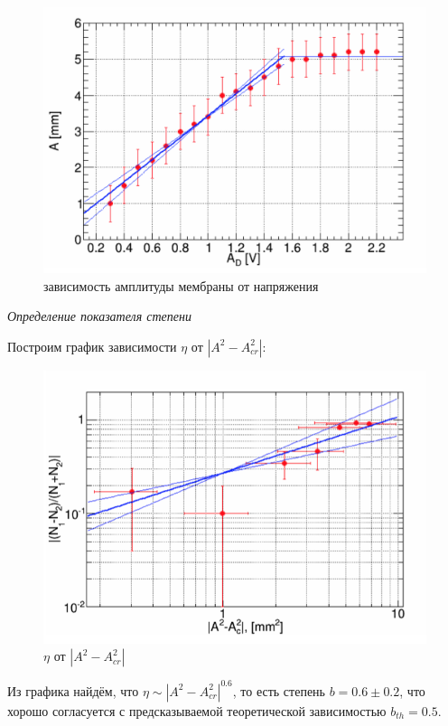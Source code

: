\documentclass[a4paper, 12pt]{article}
\begin{document}
\begin{figure}
	\includegraphics[scale=0.5]{img/A(V).jpg}
	\caption{зависимость амплитуды мембраны от напряжения}
\end{figure}

\emph{Определение показателя степени}

Построим график зависимости $\eta$ от $|A^2 - A_{cr}^2|$:

\begin{figure}[h]
	\includegraphics[scale=1]{img/result.jpg}
	\caption{$\eta$ от $|A^2 - A_{cr}^2|$}
\end{figure}

Из графика найдём, что $\eta \sim |A^2 - A_{cr}^2|^{0.6}$, то есть степень $b = 0.6 \pm 0.2$, что хорошо согласуется с предсказываемой теоретической зависимостью $b_{th} = 0.5$.
\end{document}

